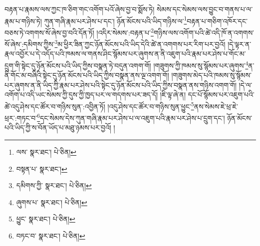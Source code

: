 བརྟན་པ་རྣམས་ལས་ཀྱང་ཁ་ཅིག་གང་འགོག་པའོ་ཞེས་བྱ་བ་སྨོས་ཏེ། སེམས་དང་སེམས་ལས་བྱུང་བ་གནས་པ་ལ་རྣམ་པ་གཉིས་ཏེ། ཀུན་གཞི་རྣམ་པར་ཤེས་པ་དང་། ཉོན་མོངས་པའི་ཡིད་གཉིས་ལ་\footnote{ལས་  སྣར་ཐང་།  པེ་ཅིན། }བརྟན་པ་གཅིག་འཁོར་དང་བཅས་ཏེ་འགགས་སོ་ཞེས་བྱ་བའི་དོན་ཏོ། །འདིར་སེམས་:བརྟན་པ་\footnote{བསྟན་པ་  སྣར་ཐང་། }གཉིས་ལས་འགོག་པའི་ཚེ་འདི་ཁོ་ན་འགགས་སོ་ཞེས་:དམིགས་ཀྱིས་\footnote{དམིགས་ཀྱི་  སྣར་ཐང་།  པེ་ཅིན། }མ་ཕྱིར་ཟིན་ཀྱང་ཉོན་མོངས་པའི་ཡིད་དེའི་ཚེ་ན་འགགས་པར་རིག་པར་བྱའོ། །དེ་ལྟར་ན་རྣལ་འབྱོར་པ་དེ་འདོད་པའི་ཁམས་ལ་གནས་ཤིང་སྙོམས་པར་ཞུགས་ན་ནི་འཇུག་པའི་རྣམ་པར་ཤེས་པ་གོང་མ་དྲུག་གི་སྟེང་དུ་ཉོན་མོངས་པའི་ཡིད་ཀྱིས་བསྣན་ཏེ་བདུན་འགག་གོ། །གཟུགས་ཀྱི་ཁམས་སུ་སྙོམས་པར་ཞུགས་\footnote{ཞུགས་པ་  སྣར་ཐང་།  པེ་ཅིན། }ན་ནི་གོང་མ་བཞིའི་སྟེང་དུ་ཉོན་མོངས་པའི་ཡིད་ཀྱིས་བསྣན་ནས་ལྔ་འགག་གོ། །གཟུགས་མེད་པའི་ཁམས་སུ་སྙོམས་པར་ཞུགས་ན་ནི་ཡིད་ཀྱི་རྣམ་པར་ཤེས་པའི་སྟེང་དུ་ཉོན་མོངས་པའི་ཡིད་ཀྱིས་བསྣན་ནས་གཉིས་འགག་གོ། །དེ་ལ་འགོག་པ་འདི་ཡང་སེམས་ཀྱི་དུས་ཀྱི་ཁྱད་པར་ལ་གདགས་པར་ཟད་དོ། །ཇི་ལྟ་ཞེ་ན། དང་པོ་སྙོམས་པར་འཇུག་པའི་ཚེ་འདུ་ཤེས་དང་ཚོར་བ་གཉིས་སུན་:འབྱིན་ཏོ། །འདུ་ཤེས་དང་ཚོར་བ་གཉིས་སུན་ཕྱུང་\footnote{ཕྱུང་  སྣར་ཐང་།  པེ་ཅིན། }ནས་སེམས་ཇེ་ཕྲ་ཇེ་ཕྲར་:གཏང་བ་\footnote{བཏང་བ་  སྣར་ཐང་།  པེ་ཅིན། }དང་སེམས་དེས་ཀུན་གཞི་རྣམ་པར་ཤེས་པ་ལ་འཇུག་པའི་རྣམ་པར་ཤེས་པ་དྲུག་དང་། ཉོན་མོངས་པའི་ཡིད་ཀྱི་ས་བོན་ཡོད་པ་མཐུ་ཉམས་པར་བྱའོ། །
